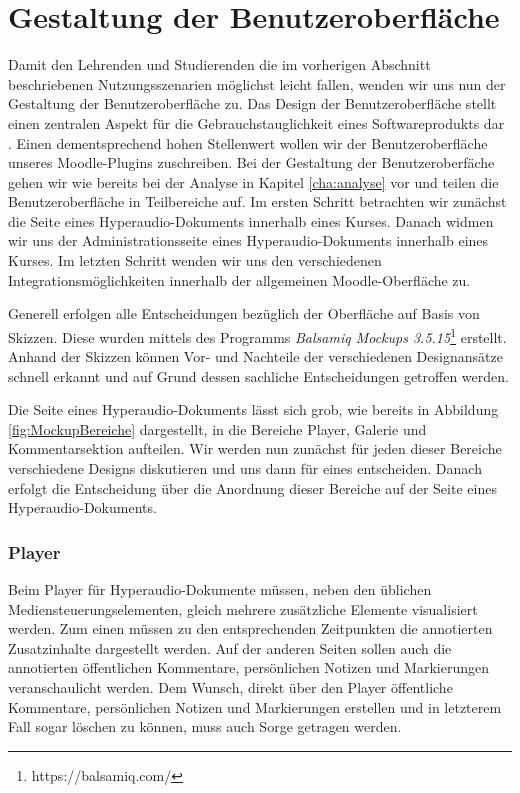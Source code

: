 \section{Gestaltung der Benutzeroberfläche}
Damit den Lehrenden und Studierenden die im vorherigen Abschnitt beschriebenen Nutzungsszenarien möglichst leicht fallen, wenden wir uns nun der Gestaltung der Benutzeroberfläche zu. \glqq Das Design der Benutzeroberfläche stellt einen zentralen Aspekt für die Gebrauchstauglichkeit eines Softwareprodukts dar\grqq{} \citep[S. 1]{oppermann2002user}. Einen dementsprechend hohen Stellenwert wollen wir der Benutzeroberfläche unseres Moodle-Plugins zuschreiben. Bei der Gestaltung der Benutzeroberfäche gehen wir wie bereits bei der Analyse in Kapitel \ref{cha:analyse} vor und teilen die Benutzeroberfläche in Teilbereiche auf. Im ersten Schritt betrachten wir zunächst die Seite eines Hyperaudio-Dokuments innerhalb eines Kurses. Danach widmen wir uns der Administrationsseite eines Hyperaudio-Dokuments innerhalb eines Kurses. Im letzten Schritt wenden wir uns den verschiedenen Integrationsmöglichkeiten innerhalb der allgemeinen Moodle-Oberfläche zu.

Generell erfolgen alle Entscheidungen bezüglich der Oberfläche auf Basis von Skizzen. Diese wurden mittels des Programms \textit{Balsamiq Mockups 3.5.15}\footnote{https://balsamiq.com/} erstellt. Anhand der Skizzen können Vor- und Nachteile der verschiedenen Designansätze schnell erkannt und auf Grund dessen sachliche Entscheidungen getroffen werden. 


Die Seite eines Hyperaudio-Dokuments lässt sich grob, wie bereits in Abbildung \ref{fig:MockupBereiche} dargestellt, in die Bereiche Player, Galerie und Kommentarsektion aufteilen. Wir werden nun zunächst für jeden dieser Bereiche verschiedene Designs diskutieren und uns dann für eines entscheiden. Danach erfolgt die Entscheidung über die Anordnung dieser Bereiche auf der Seite eines Hyperaudio-Dokuments.


\subsubsection{Player}
Beim Player für Hyperaudio-Dokumente müssen, neben den üblichen Mediensteuerungselementen, gleich mehrere zusätzliche Elemente visualisiert werden. Zum einen müssen zu den entsprechenden Zeitpunkten die annotierten Zusatzinhalte dargestellt werden. Auf der anderen Seiten sollen auch die annotierten öffentlichen Kommentare, persönlichen Notizen und Markierungen veranschaulicht werden. Dem Wunsch, direkt über den Player öffentliche Kommentare, persönlichen Notizen und Markierungen erstellen und in letzterem Fall sogar löschen zu können, muss auch Sorge getragen werden.

